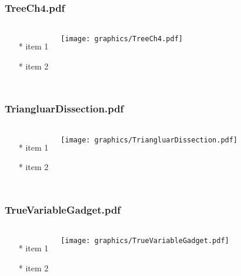 \begin{frame} \frametitle{TreeCh4.pdf}
    \begin{columns}[c]
        \begin{itemize}
            \item[*] item 1
            \item[*] item 2
        \end{itemize}
        \begin{minipage}{\linewidth}
            \begin{center}
            \texttt{[image: graphics/TreeCh4.pdf]}
            \label{gfx:TreeCh4.pdf}
            \end{center}
        \end{minipage}
    \end{columns}
\end{frame}
\begin{frame} \frametitle{TriangluarDissection.pdf}
    \begin{columns}[c]
        \begin{itemize}
            \item[*] item 1
            \item[*] item 2
        \end{itemize}
        \begin{minipage}{\linewidth}
            \begin{center}
            \texttt{[image: graphics/TriangluarDissection.pdf]}
            \label{gfx:TriangluarDissection.pdf}
            \end{center}
        \end{minipage}
    \end{columns}
\end{frame}
\begin{frame} \frametitle{TrueVariableGadget.pdf}
    \begin{columns}[c]
        \begin{itemize}
            \item[*] item 1
            \item[*] item 2
        \end{itemize}
        \begin{minipage}{\linewidth}
            \begin{center}
            \texttt{[image: graphics/TrueVariableGadget.pdf]}
            \label{gfx:TrueVariableGadget.pdf}
            \end{center}
        \end{minipage}
    \end{columns}
\end{frame}

